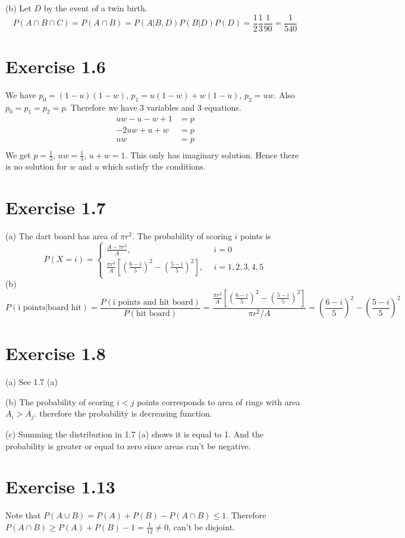 \documentclass[12pt]{article}
\begin{document}
(b) Let $D$ by the event of a twin birth. $$P(A \cap B \cap C) = P(A \cap B) = P(A | B, D) P(B | D ) P(D) = \frac{1}{2} \frac{1}{3} \frac{1}{90} = \frac{1}{540}  $$

\section*{Exercise 1.6}
We have $p_0 = (1-u)(1-w)$, $p_1 = u(1-w) + w(1-u)$, $p_2 = uw$. Also $p_0=p_1=p_2 = p$. Therefore we have 3 variables and 3 equations. 
$$\begin{aligned}
  uw - u - w + 1 &= p \\
  -2uw + u + w &= p \\
  uw &= p \\
\end{aligned}
$$
We get $p=\frac{1}{3}$, $uw = \frac{1}{3}$, $u + w = 1$. This only has imaginary solution. Hence there is no solution for $w$ and $u$ which satisfy the conditions.

\section*{Exercise 1.7}
(a) The dart board has area of $\pi r^2$. The probability of scoring $i$ points is
$$P(X=i) = \begin{cases}
	\frac{A - \pi r^2}{A}, \ \ &i=0 \\
	\frac{\pi r^2}{A} \left[ \left( \frac{6-i}{5} \right)^2 -  \left( \frac{5-i}{5}\right)^2  \right], \ \ &i =1,2,3,4,5
\end{cases}
$$
(b) $$ P(\mbox{i points}|\mbox{board hit}) = \frac{P(\mbox{i points and hit board})}{P(\mbox{hit board})} = \frac{\frac{\pi r^2}{A} \left[ \left( \frac{6-i}{5} \right)^2 -  \left( \frac{5-i}{5}\right)^2  \right]}{ \pi r^2/ A} = \left( \frac{6-i}{5} \right)^2 -  \left( \frac{5-i}{5}\right)^2 $$

\section*{Exercise 1.8}
(a) See 1.7 (a)

(b) The probability of scoring $i < j$ points corresponds to area of rings with area $A_i > A_j$. therefore the probability is decreasing function.

(c) Summing the distribution in 1.7 (a) shows it is equal to 1. And the probability is greater or equal to zero since areas can't be negative.


\section*{Exercise 1.13}
Note that $P(A\cup B) = P(A) + P(B) - P(A\cap B) \leq 1$. Therefore $P(A\cap B) \geq P(A) + P(B) - 1 =\frac{1}{12} \neq 0$, can't be disjoint.
\end{document}
